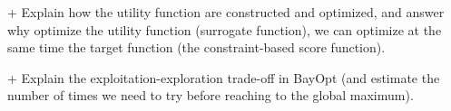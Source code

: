 + Explain how the utility function are constructed and optimized, and answer why optimize the utility function (surrogate function), we can optimize at the same time the target function (the constraint-based score function).

+ Explain the exploitation-exploration trade-off in BayOpt (and estimate the number of times we need to try before reaching to the global maximum).

